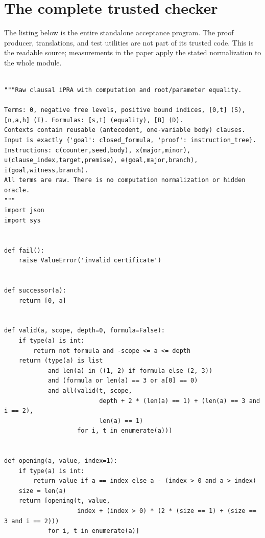 \documentclass[11pt,letterpaper]{article}
\begin{document}
\clearpage
\appendix
\section{The complete trusted checker}
The listing below is the entire standalone acceptance program. The
proof producer, translations, and test utilities are not part of its
trusted code. This is the readable source; measurements in the paper
apply the stated normalization to the whole module.
\begin{lstlisting}

"""Raw clausal iPRA with computation and root/parameter equality.

Terms: 0, negative free levels, positive bound indices, [0,t] (S),
[n,a,h] (I). Formulas: [s,t] (equality), [B] (D).
Contexts contain reusable (antecedent, one-variable body) clauses.
Input is exactly {'goal': closed_formula, 'proof': instruction_tree}.
Instructions: c(counter,seed,body), x(major,minor),
u(clause_index,target,premise), e(goal,major,branch), i(goal,witness,branch).
All terms are raw. There is no computation normalization or hidden oracle.
"""
import json
import sys


def fail():
    raise ValueError('invalid certificate')


def successor(a):
    return [0, a]


def valid(a, scope, depth=0, formula=False):
    if type(a) is int:
        return not formula and -scope <= a <= depth
    return (type(a) is list
            and len(a) in ((1, 2) if formula else (2, 3))
            and (formula or len(a) == 3 or a[0] == 0)
            and all(valid(t, scope,
                          depth + 2 * (len(a) == 1) + (len(a) == 3 and i == 2),
                          len(a) == 1)
                    for i, t in enumerate(a)))


def opening(a, value, index=1):
    if type(a) is int:
        return value if a == index else a - (index > 0 and a > index)
    size = len(a)
    return [opening(t, value,
                    index + (index > 0) * (2 * (size == 1) + (size == 3 and i == 2)))
            for i, t in enumerate(a)]



\end{lstlisting}
\end{document}
